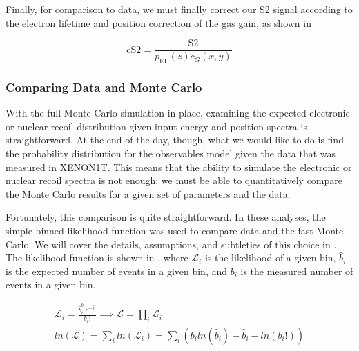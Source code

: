 Finally, for comparison to data, we must finally correct our S2 signal according to the electron lifetime and position correction of the gas gain, as shown in 


\begin{equation}
        \label{eqn:s2_correction}
        \textrm{cS2} = \frac{\textrm{S2}}{p_{\textrm{EL}}(z) c_G(x, y)} 
\end{equation}


\subsubsection{Comparing Data and Monte Carlo}
\label{sec:xe1t_mc_likelihood}

With the full Monte Carlo simulation in place, examining the expected electronic or nuclear recoil distribution given input energy and position spectra is straightforward.  At the end of the day, though, what we would like to do is find the probability distribution for the observables model given the data that was measured in XENON1T.  This means that the ability to simulate the electronic or nuclear recoil spectra is not enough: we must be able to quantitatively compare the Monte Carlo results for a given set of parameters and the data.

Fortunately, this comparison is quite straightforward.  In these analyses, the simple binned likelihood function was used to compare data and the fast Monte Carlo.  We will cover the details, assumptions, and subtleties of this choice in .  The likelihood function is shown in , where $\mathcal{L}_i$ is the likelihood of a given bin, $\hat{b}_i$ is the expected number of events in a given bin, and $b_i$ is the measured number of events in a given bin.

\begin{equation}
        \label{eqn:xe1t_binned_likelihood}
        \begin{gathered}
                \mathcal{L}_i = \frac{\hat{b}_i^{b_i} e^{-\hat{b}_i}}{b_i!} \implies \mathcal{L} = \prod_i \mathcal{L}_i \\ 
                ln(\mathcal{L}) = \sum_i ln(\mathcal{L}_i) = \sum_i ( b_i ln(\hat{b}_i) - \hat{b}_i - ln(b_i!) )
        \end{gathered}
\end{equation}


